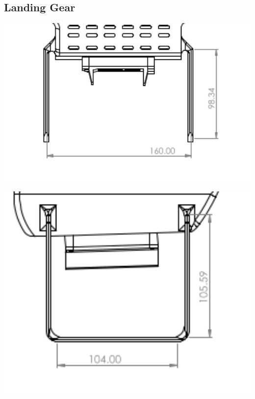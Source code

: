 \documentclass[12pt]{report}
\begin{document}
      \subsection*{Landing Gear}
      \begin{minipage}{0.4\textwidth}
        \centering
        \includegraphics[width=1\textwidth]{landing1.png}

      \end{minipage}%
      \hfill
      \begin{minipage}{0.32\textwidth}
          \centering
          \includegraphics[width=1\textwidth]{landing2.png}
      \end{minipage}%
\end{document}
